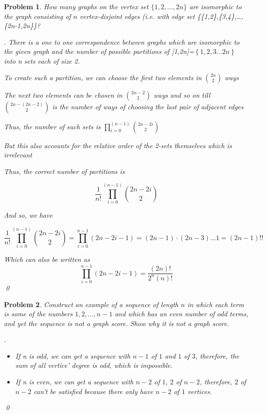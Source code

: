 \documentclass[12pt]{article}
\newtheorem{hw}{Problem}
\newenvironment{sol}
  {\par\vspace{3mm}\noindent{\it Solution}.}
  {\qed}
\begin{document}
\begin{hw}
How many graphs on the vertex set $\{1,2,\ldots,2n\}$ are isomorphic to the graph consisting of $n$ vertex-disjoint edges (i.e. with edge set \{\{1,2\},\{3,4\},\ldots, \{2n-1,2n\}\}?

\begin{sol}
\renewcommand{\qedsymbol}{}
    There is a one to one correspondence between graphs which are isomorphic to the given graph and the number of possible partitions of [1,2n]=$\left\{1,2,3\dots 2n \right \}$ into n sets each of size 2.\par
    To create such a partition, we can choose the first two elements in $\binom{2n}{2}$ ways

    The next two elements can be chosen in $\binom{2n-2}{2}$ ways and so on till $\binom{2n-(2n-2)}{2}$ is the number of ways of choosing the last pair of adjacent edges
 
    Thus, the number of such sets is $\prod_{i=0}^{(n-1)}\binom{2n-2i}{2}$

    But this also accounts for the relative order of the 2-sets themselves which is irrelevant

    Thus, the correct number of partitions is

    $$\frac{1}{n!}\prod_{i=0}^{(n-1)}\binom{2n-2i}{2}$$

    And so, we have

    $$\frac{1}{n!}\prod_{i=0}^{(n-1)}\binom{2n-2i}{2}=\prod_{i=0}^{n-1}(2n-2i-1)=(2n-1)\cdot (2n-3)\dots 1=(2n-1)!!$$

    Which can also be written as $$\prod_{i=0}^{n-1}(2n-2i-1)=\frac{(2n)!}{2^{n}(n)!}$$
\end{sol}
\end{hw}


\begin{hw}
Construct an example of a sequence of length $n$ in which each term is some of the numbers $1,2,\ldots, n-1$ and which has an even number of odd terms, and yet the sequence is not a graph score. Show why it is not a graph score.

\begin{sol}\par
\renewcommand{\qedsymbol}{}
     \begin{itemize}
      \item If n is odd, we can get a sequence with $n-1$ of $1$ and $1$ of $3$, therefore, the sum of all vertice' degree is odd, which is impossible.
      \item If n is even, we can get a sequence with $n-2$ of $1$, $2$ of $n-2$, therefore, $2$ of $n-2$ can't be satisfied because there only have $n-2$ of $1$ vertices.
     \end{itemize}
\end{sol}

\end{hw}
\end{document}

